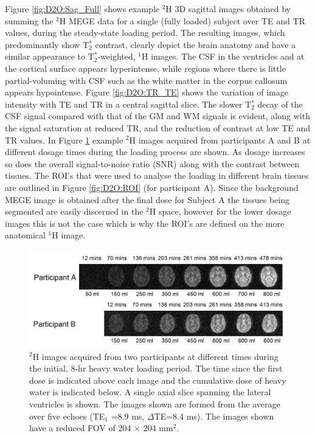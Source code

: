 \documentclass[class=article, crop=false]{standalone}
\begin{document}
Figure \ref{fig:D2O:Sag_Full} shows example $^2$H 3D sagittal images obtained by summing the $^2$H MEGE data for a single (fully loaded) subject over TE and TR values, during the steady-state loading period. The resulting images, which predominantly show T$_2^*$ contrast, clearly depict the brain anatomy and have a similar appearance to T$_2^*$-weighted, $^1$H images. The CSF in the ventricles and at the cortical surface appears hyperintense, while regions where there is little partial-voluming with CSF such as the white matter in the corpus callosum appears hypointense. Figure \ref{fig:D2O:TR_TE} shows the variation of image intensity with TE and TR in a central sagittal slice. The slower T$_2^*$ decay of the CSF signal compared with that of the GM and WM signals is evident, along with the signal saturation at reduced TR, and the reduction of contrast at low TE and TR values. In Figure \ref{fig:D2O:Load} example $^2$H images acquired from participants A and B at different dosage times during the loading process are shown. As dosage increases so does the overall signal-to-noise ratio (SNR) along with the contrast between tissues. The ROI’s that were used to analyse the loading in different brain tissues are outlined in Figure \ref{fig:D2O:ROI} (for participant A). Since the background MEGE image is obtained after the final dose for Subject A the tissues being segmented are easily discerned in the $^2$H space, however for the lower dosage images this is not the case which is why the ROI’s are defined on the more anatomical $^1$H image. 

\begin{figure}
    \centering
    \includegraphics[width=1\textwidth]{Figures/D2O/Loading.png}
    \caption{$^2$H images acquired from two participants at different times during the initial, 8-hr heavy water loading period. The time since the first dose is indicated above each image and the cumulative dose of heavy water is indicated below. A single axial slice spanning the lateral ventricles is shown. The images shown are formed from the average over five echoes (TE$_1$ =8.9 ms, $\Delta$TE=8.4 ms). The images shown have a reduced FOV of 204 × 204 mm$^2$.}
    \label{fig:D2O:Load}
\end{figure}
\end{document}
